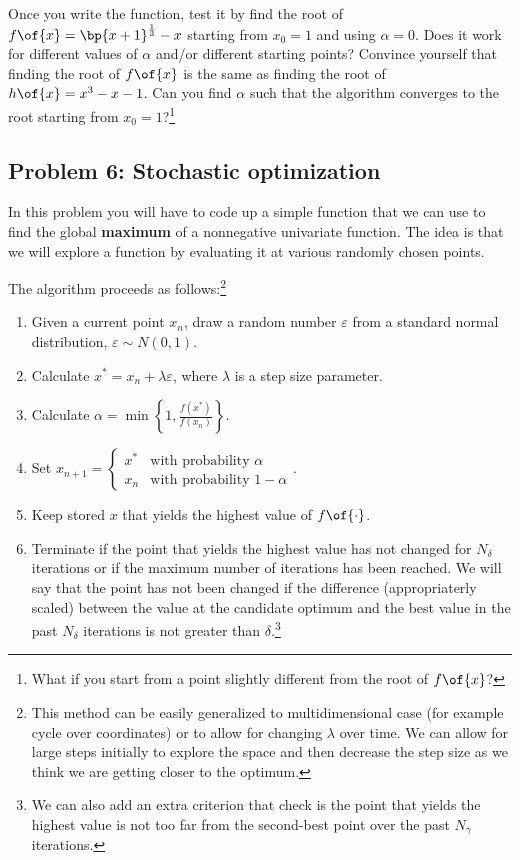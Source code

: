 \documentclass[english,hyperref={pdftex,pdfpagemode=UseNone,hidelinks}]{tufte-handout}
\begin{document}
Once you write the function, test it by find the root of $f\of{x}=\bp{x+1}^\frac{1}{3}-x$ starting from $x_0 = 1$ and using $\alpha = 0$. Does it work for different values of $\alpha$ and/or different starting points? Convince yourself that finding the root of $f\of{x}$ is the same as finding the root of $h\of{x}=x^3-x-1$. Can you find $\alpha$ such that the algorithm converges to the root starting from $x_0=1$?\footnote{What if you start from a point slightly different from the root of $f\of{x}$?} 

\subsection*{Problem 6: Stochastic optimization}
In this problem you will have to code up a simple function that we
can use to find the global \textbf{maximum} of a nonnegative univariate function. The idea is that we will explore a function by evaluating it at various randomly chosen points.

The algorithm proceeds as follows:\footnote{This method can be easily generalized to multidimensional case (for example cycle over coordinates) or to allow for changing $\lambda$ over time. We can allow for large steps initially to explore the space and then decrease the step size as we think we are getting closer  to the optimum.}

\begin{enumerate}
    \item Given a current point $x_n$, draw a random number $\varepsilon$ from a standard normal distribution, $\varepsilon \sim N(0,1)$. 
    \item Calculate $x^* = x_n + \lambda \varepsilon$, where $\lambda$ is a step size parameter.
    \item Calculate $\alpha = \min\left\{1, \frac{f(x^*)}{f(x_n)}\right\}$.
    \item Set $x_{n+1} = \begin{cases} x^* & \text{with probability } \alpha \\ x_n & \text{with probability } 1-\alpha \end{cases}$.
    \item Keep stored $x$ that yields the highest value of $f\of{\cdot}$. 
    \item Terminate if the point that yields the highest value has not changed for $N_\delta$ iterations or if the maximum number of iterations has been reached. We will say that the point has not been changed if the difference (appropriaterly scaled) between the value at the candidate optimum and the best value in the past $N_\delta$ iterations is not greater than $\delta$.\footnote{We can also add an extra criterion that check is the point that yields the highest value is not too far from the second-best point over the past $N_\gamma$ iterations.}
\end{enumerate}
\end{document}
